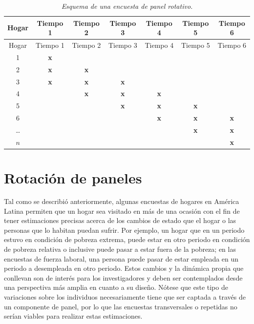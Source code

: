 \documentclass[
  12pt,
  spanish,
]{book}
\begin{document}
\begin{longtable}[]{@{}ccccccc@{}}
\caption{\emph{Esquema de una encuesta de panel rotativo.}}\tabularnewline
\toprule
Hogar & Tiempo 1 & Tiempo 2 & Tiempo 3 & Tiempo 4 & Tiempo 5 & Tiempo 6 \\
\midrule
\endfirsthead
\toprule
Hogar & Tiempo 1 & Tiempo 2 & Tiempo 3 & Tiempo 4 & Tiempo 5 & Tiempo 6 \\
\midrule
\endhead
1 & \textbf{x} & & & & & \\
2 & \textbf{x} & \textbf{x} & & & & \\
3 & \textbf{x} & \textbf{x} & \textbf{x} & & & \\
4 & & \textbf{x} & \textbf{x} & \textbf{x} & & \\
5 & & & \textbf{x} & \textbf{x} & \textbf{x} & \\
6 & & & & \textbf{x} & \textbf{x} & \textbf{x} \\
\ldots{} & & & & & \textbf{x} & \textbf{x} \\
\(n\) & & & & & & \textbf{x} \\
\bottomrule
\end{longtable}

\hypertarget{rotaciuxf3n-de-paneles}{%
\section{Rotación de paneles}\label{rotaciuxf3n-de-paneles}}

Tal como se describió anteriormente, algunas encuestas de hogares en América Latina permiten que un hogar sea visitado en más de una ocasión con el fin de tener estimaciones precisas acerca de los cambios de estado que el hogar o las personas que lo habitan puedan sufrir. Por ejemplo, un hogar que en un periodo estuvo en condición de pobreza extrema, puede estar en otro periodo en condición de pobreza relativa o inclusive puede pasar a estar fuera de la pobreza; en las encuestas de fuerza laboral, una persona puede pasar de estar empleada en un periodo a desempleada en otro periodo. Estos cambios y la dinámica propia que conllevan son de interés para los investigadores y deben ser contemplados desde una perspectiva más amplia en cuanto a su diseño. Nótese que este tipo de variaciones sobre los individuos necesariamente tiene que ser captada a través de un componente de panel, por lo que las encuestas transversales o repetidas no serían viables para realizar estas estimaciones.
\end{document}
